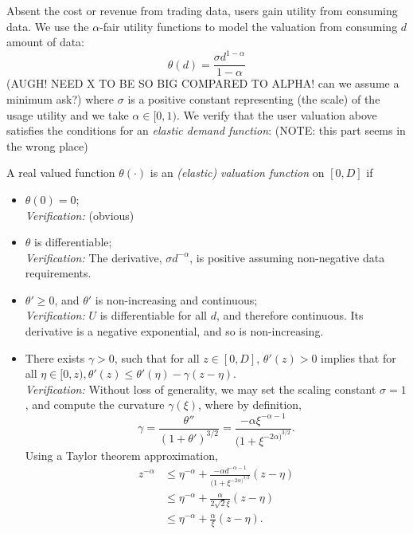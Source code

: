 \documentclass[12pt]{article}
\theoremstyle{definition}
\begin{document}
\begin{multicols}{2}
Absent the cost or revenue from trading data, users gain utility from consuming
data. We use the $\alpha$-fair utility functions \cite{zheng} to model the
valuation from consuming $d$ amount of data:
\begin{equation}\label{buyervaluation}
    \theta(d) = \frac{\sigma d^{1-\alpha}}{1-\alpha}
\end{equation}
(AUGH! NEED X TO BE SO BIG COMPARED TO ALPHA! can we assume a minimum ask?)
where $\sigma$ is a positive constant representing (the scale) of the usage
utility and we take $\alpha \in [0, 1)$.
We verify that the user valuation above satisfies the conditions for an
\emph{elastic demand function}: (NOTE: this part seems in the wrong place)

A real valued function $\theta(\cdot)$ is an \emph{(elastic) valuation
function} on $[0, D]$ if 
\begin{itemize}
    \item $\theta(0) = 0$; \\
        \emph{Verification:} (obvious)
    \item $\theta$ is differentiable; \\
        \emph{Verification:} The derivative, $\sigma d^{-\alpha}$, is positive assuming non-negative
data requirements.
    \item $\theta ' \ge 0$, and $\theta '$ is non-increasing and continuous; \\
        \emph{Verification:} $U$ is differentiable for all $d$, and therefore
continuous. Its derivative is a negative exponential, and so is non-increasing.
    \item There exists $\gamma > 0$, such that for all $z \in [0,D]$, $\theta
'(z) > 0$ implies that for all $\eta \in [0, z), \theta '(z) \le \theta '(\eta)
- \gamma(z - \eta)$. \\
        \emph{Verification:} Without loss of generality, we may set the scaling
constant $\sigma=1$, and compute the curvature $\gamma(\xi)$, where by definition,
$$
    \gamma = \frac{\theta''}{(1+\theta')^{3/2}} = \frac{-\alpha
\xi^{-\alpha-1}}{(1+\xi^{-2\alpha)^{3/2}}}.
$$
Using a Taylor theorem approximation,
\begin{align*}
    z^{-\alpha} &\le \eta^{-\alpha} + \frac{-\alpha
d^{-\alpha-1}}{(1+\xi^{-2\alpha)^{3/2}}}(z-\eta) \\
    & \le \eta^{-\alpha} +
\frac{\alpha}{2\sqrt{2} \xi}(z-\eta)  \\
    &\le \eta^{-\alpha} +
\frac{\alpha}{\xi}(z-\eta).

\end{align*}
\end{itemize}
\end{multicols}
\end{document}
